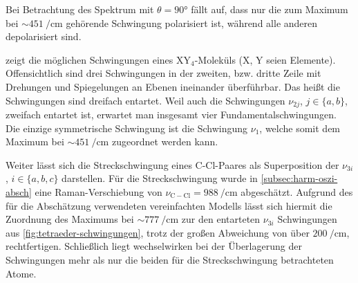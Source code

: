 \documentclass[../bericht.tex]{subfiles}
\begin{document}
        Bei Betrachtung des Spektrum mit $\theta=\ang{90}$ fällt auf, dass nur die zum Maximum bei $\sim\SI{451}{\per\centi\meter}$ gehörende Schwingung polarisiert ist, während alle anderen depolarisiert sind.

         zeigt die möglichen Schwingungen eines $\mathrm{XY_4}$-Moleküls (X, Y seien Elemente). Offensichtlich sind drei Schwingungen in der zweiten, bzw. dritte Zeile mit Drehungen und Spiegelungen an Ebenen ineinander überführbar. Das heißt die Schwingungen sind dreifach entartet. Weil auch die Schwingungen $\nu_{2j}$, $j\in\{a,b\}$, zweifach entartet ist, erwartet man insgesamt vier Fundamentalschwingungen. Die einzige symmetrische Schwingung ist die Schwingung $\nu_1$, welche somit dem Maximum bei $\sim\SI{451}{\per\centi\meter}$ zugeordnet werden kann.
        \medskip

        Weiter lässt sich die Streckschwingung eines C-Cl-Paares als Superposition der $\nu_{3i}$, $i\in\{ a,b,c\}$ darstellen. Für die Streckschwingung wurde in \cref{subsec:harm-oszi-absch} eine Raman-Verschiebung von $\nu_\mathrm{C-Cl}=\SI{988}{\per\centi\meter}$ abgeschätzt. Aufgrund des für die Abschätzung verwendeten vereinfachten Modells lässt sich hiermit die Zuordnung des Maximums bei $\sim \SI{777}{\per\centi\meter}$ zur den entarteten $\nu_{3i}$ Schwingungen aus \cref{fig:tetraeder-schwingungen}, trotz der großen Abweichung von über $\SI{200}{\per\centi\meter}$, rechtfertigen. Schließlich liegt wechselwirken bei der Überlagerung der Schwingungen mehr als nur die beiden für die Streckschwingung betrachteten Atome.
        \medskip
\end{document}
